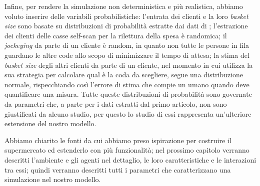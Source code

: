 Infine, per rendere la simulazione non deterministica e più realistica, abbiamo voluto inserire delle variabili probabilistiche: l'entrata dei clienti e la loro \textit{basket size} sono basate su distribuzioni di probabilità estratte dai dati di \cite{article1}; l'estrazione dei clienti delle casse self-scan per la rilettura della spesa è randomica; il \textit{jockeying} da parte di un cliente è random, in quanto non tutte le persone in fila guardano le altre code allo scopo di minimizzare il tempo di attesa; la stima del \textit{basket size} degli altri clienti da parte di un cliente, nel momento in cui utilizza la sua strategia per calcolare qual è la coda da scegliere, segue una distribuzione normale, rispecchiando così l'errore di stima che compie un umano quando deve quantificare una misura. Tutte queste distribuzioni di probabilità sono governate da parametri che, a parte per i dati estratti dal primo articolo, non sono giustificati da alcuno studio, per questo lo studio di essi rappresenta un'ulteriore estensione del nostro modello.

\vspace*{1\baselineskip}

Abbiamo chiarito le fonti da cui abbiamo preso ispirazione per costruire il supermercato ed estenderlo con più funzionalità; nel prossimo capitolo verranno descritti l'ambiente e gli agenti nel dettaglio, le loro caratteristiche e le interazioni tra essi; quindi verranno descritti tutti i parametri che caratterizzano una simulazione nel nostro modello.